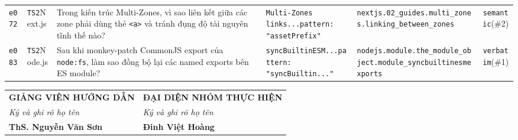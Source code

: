 \begin{table}[H]
\begin{tabularx}{\textwidth}{ll>{\raggedright\arraybackslash}X>{\raggedright\arraybackslash}p{3.0cm}>{\raggedright\arraybackslash}p{3.9cm}c}
\addlinespace[2pt]
\texttt{e072} & \texttt{TS2}\newline Next.js & Trong kiến trúc Multi-Zones, vì sao liên kết giữa các zone phải dùng thẻ \texttt{<a>} và tránh đụng độ tài nguyên tĩnh thế nào? & \texttt{Multi-Zones links...}\newline\texttt{pattern: "assetPrefix"} & \nolinkurl{nextjs.02_guides.multi_zones.linking_between_zones} & \texttt{semantic}\newline (\#2) \\
\addlinespace[2pt]
\texttt{e083} & \texttt{TS2}\newline Node.js & Sau khi monkey-patch CommonJS export của \texttt{node:fs}, làm sao đồng bộ lại các named exports bên ES module? & \texttt{syncBuiltinESM...}\newline\texttt{pattern: "syncBuiltin..."} & \nolinkurl{nodejs.module.the_module_object.module_syncbuiltinesmexports} & \texttt{verbatim}\newline (\#1) \\
\bottomrule
\end{tabularx}
\end{table}

\vspace{0.3cm}
\begin{center}
\begin{tabular}{p{}p{}}
\centering \textbf{GIẢNG VIÊN HƯỚNG DẪN} & \centering\arraybackslash \textbf{ĐẠI DIỆN NHÓM THỰC HIỆN} \\
\centering \textit{Ký và ghi rõ họ tên} & \centering\arraybackslash \textit{Ký và ghi rõ họ tên} \\[1.8cm]
\centering \textbf{ThS. Nguyễn Văn Sơn} & \centering\arraybackslash \textbf{Đinh Việt Hoàng}
\end{tabular}
\end{center}
